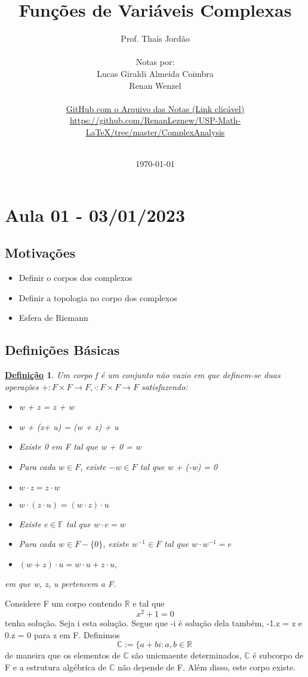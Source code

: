 \documentclass{article}
\title{Fun\c c\~oes de Vari\'aveis Complexas}
\author{Prof. Tha\'is Jord\~ao\\
  \vspace{2cm}\\
  Notas por:\\
  Lucas Giraldi Almeida Coimbra\\
  Renan Wenzel\\
  \vspace{4cm}\\
  \href{https://github.com/RenanLeznew/USP-Math-LaTeX/tree/master/ComplexAnalysis}{GitHub com o Arquivo das Notas (Link clic\'avel)}\\
  \url{https://github.com/RenanLeznew/USP-Math-LaTeX/tree/master/ComplexAnalysis}\\
  \vspace{4cm}\\
}
\date{\today}
\newtheorem*{def*}{\underline{Defini\c c\~ao}}
\begin{document}
  \maketitle
  \newpage
  \tableofcontents
  \newpage

  \section{Aula 01 - 03/01/2023}
  \subsection{Motiva\c c\~oes}
  \begin{itemize}
   \item Definir o corpos dos complexos
   \item Definir a topologia no corpo dos complexos
   \item Esfera de Riemann
  \end{itemize}

  \subsection{Defini\c c\~oes B\'asicas}
  \begin{def*}
    Um corpo f \'e um conjunto n\~ao vazio em que definem-se duas opera\c c\~oes $+:F\times{F}\rightarrow F, \cdot:F\times{F}\rightarrow F$ satisfazendo:
  \begin{itemize}
    \item[i)] w + z = z + w
    \item[ii)] w + (z+ u) = (w + z) + u
    \item[iii)] Existe 0 em F tal que w + 0 = w
    \item[iv)] Para cada $w\in F$, existe $-w \in F$ tal que w + (-w) = 0
    \item[v)] $w\cdot z = z\cdot w$
    \item[vi)] $w\cdot(z\cdot u) = (w\cdot z)\cdot u$
    \item[vii)] Existe $e\in \mathbb{F}$ tal que $w\cdot{e} = w$
    \item[viii)] Para cada $w\in{F-\{0\}}$, existe $w ^{-1}\in{F}$ tal que $w\cdot w ^{-1} = e$
    \item[ix)] $(w+z)\cdot{u} = w\cdot u + z\cdot u,$
  \end{itemize}
  em que w, z, u pertencem a F.
  \end{def*}
  Considere F um corpo contendo $\mathbb{R}$ e tal que 
  $$
  x ^{2} + 1 = 0
  $$
tenha solu\c c\~ao. Seja i esta solu\c c\~ao. Segue que -i \'e solu\c c\~ao dela tamb\'em, -1.z = z e 0.z = 0 para z em F. Definimos
  $$
  \mathbb{C}:= \{a + bi: a, b\in \mathbb{R}\,
  $$
de maneira que os elementos de $\mathbb{C}$ s\~ao unicmaente determinados, $\mathbb{C}$ \'e subcorpo de F e a estrutura 
alg\'ebrica de $\mathbb{C}$ n\~ao depende de F. Al\'em disso, este corpo existe.
\end{document}
